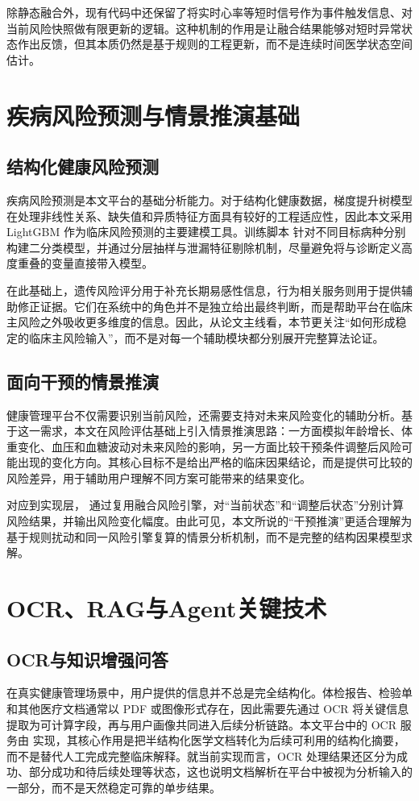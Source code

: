 除静态融合外，现有代码中还保留了将实时心率等短时信号作为事件触发信息、对当前风险快照做有限更新的逻辑。这种机制的作用是让融合结果能够对短时异常状态作出反馈，但其本质仍然是基于规则的工程更新，而不是连续时间医学状态空间估计。

\section{疾病风险预测与情景推演基础}
\subsection{结构化健康风险预测}
疾病风险预测是本文平台的基础分析能力。对于结构化健康数据，梯度提升树模型在处理非线性关系、缺失值和异质特征方面具有较好的工程适应性，因此本文采用 LightGBM 作为临床风险预测的主要建模工具。训练脚本  针对不同目标病种分别构建二分类模型，并通过分层抽样与泄漏特征剔除机制，尽量避免将与诊断定义高度重叠的变量直接带入模型。

在此基础上，遗传风险评分用于补充长期易感性信息，行为相关服务则用于提供辅助修正证据。它们在系统中的角色并不是独立给出最终判断，而是帮助平台在临床主风险之外吸收更多维度的信息。因此，从论文主线看，本节更关注“如何形成稳定的临床主风险输入”，而不是对每一个辅助模块都分别展开完整算法论证。

\subsection{面向干预的情景推演}
健康管理平台不仅需要识别当前风险，还需要支持对未来风险变化的辅助分析。基于这一需求，本文在风险评估基础上引入情景推演思路：一方面模拟年龄增长、体重变化、血压和血糖波动对未来风险的影响，另一方面比较干预条件调整后风险可能出现的变化方向。其核心目标不是给出严格的临床因果结论，而是提供可比较的风险差异，用于辅助用户理解不同方案可能带来的结果变化。

对应到实现层， 通过复用融合风险引擎，对“当前状态”和“调整后状态”分别计算风险结果，并输出风险变化幅度。由此可见，本文所说的“干预推演”更适合理解为基于规则扰动和同一风险引擎复算的情景分析机制，而不是完整的结构因果模型求解。

\section{OCR、RAG与Agent关键技术}
\subsection{OCR与知识增强问答}
在真实健康管理场景中，用户提供的信息并不总是完全结构化。体检报告、检验单和其他医疗文档通常以 PDF 或图像形式存在，因此需要先通过 OCR 将关键信息提取为可计算字段，再与用户画像共同进入后续分析链路。本文平台中的 OCR 服务由  实现，其核心作用是把半结构化医学文档转化为后续可利用的结构化摘要，而不是替代人工完成完整临床解释。就当前实现而言，OCR 处理结果还区分为成功、部分成功和待后续处理等状态，这也说明文档解析在平台中被视为分析输入的一部分，而不是天然稳定可靠的单步结果。

